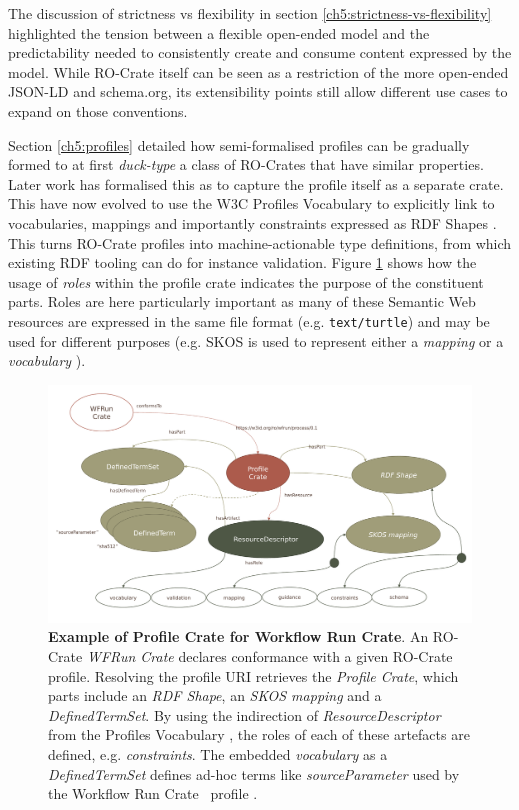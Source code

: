 The discussion of strictness vs flexibility in section \vref{ch5:strictness-vs-flexibility} highlighted the tension between a flexible open-ended model and the predictability needed to consistently create and consume content expressed by the model.
While RO-Crate itself can be seen as a restriction of the more open-ended JSON-LD and schema.org, its extensibility points still allow different use cases to expand on those conventions.  

Section \vref{ch5:profiles} detailed how semi-formalised profiles can be gradually formed to at first \emph{duck-type} a class of RO-Crates that have similar properties.
Later work has formalised this as  to capture the profile itself as a separate crate. This have now evolved to use the W3C Profiles Vocabulary \cite{dx-prof} to explicitly link to vocabularies, mappings and importantly constraints expressed as RDF Shapes \cite{fdo-collections}. 
This turns RO-Crate profiles into machine-actionable type definitions, from which existing RDF tooling can do for instance validation. 
Figure \ref{ch61:fig:profilecrate} shows how the usage of \emph{roles} within the profile crate indicates the purpose of the constituent parts.
Roles are here particularly important as many of these Semantic Web resources are expressed in the same file format (e.g. \texttt{text/turtle}) and may be used for different purposes (e.g.
SKOS is used to represent either a \emph{mapping} or a \emph{vocabulary} \cite{w3-skos-primer}).

\begin{figure}[htb]
    \includegraphics[width=\textwidth]{figures/ch09/profile-crate.pdf}
      \caption[Example of Profile Crate]{\textbf{Example of Profile Crate for Workflow Run Crate}. 
      An RO-Crate \emph{WFRun Crate} declares conformance with a given RO-Crate profile. 
      Resolving the profile URI retrieves the \emph{Profile Crate}, which parts include an \emph{RDF Shape}, an \emph{SKOS mapping} and a \emph{DefinedTermSet}. 
      By using the indirection of \emph{ResourceDescriptor} from the Profiles Vocabulary \cite{dx-prof}, the roles of each of these artefacts are defined, e.g. \emph{constraints}. 
      The embedded \emph{vocabulary} as a \emph{DefinedTermSet} defines ad-hoc terms like \emph{sourceParameter} used by the Workflow Run Crate\footnotemark~ profile \cite{workflow-run-crate}.
      }
    \label{ch61:fig:profilecrate}
  \end{figure}

